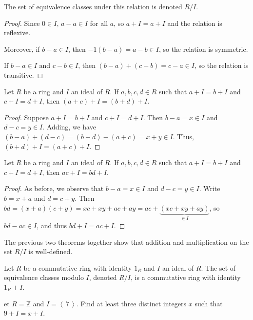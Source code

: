 \documentclass[english,course]{lecture}
\newcommand{\ideal}[1]{\left\langle\, #1 \,\right\rangle}
\theoremstyle{plain}
\newenvironment{exercise}[1]
  {\renewcommand\theinnerexercise{#1}\innerexercise}
  {\endinnerexercise}
\def\Z{{\mathbb Z}}
\def\presnotes{}
\begin{document}
The set of equivalence classes under this relation is denoted $R/I$.

\begin{proof}
	Since $0\in I$, $a-a \in I$ for all $a$, so $a + I = a+I$ and the relation is reflexive.
	
	Moreover, if $b-a \in I$, then $-1(b-a) = a-b \in I$, so the relation is symmetric.
	
	If $b-a \in I$ and $c-b\in I$, then $(b-a) + (c-b) = c-a \in I$, so the relation is transitive.
\end{proof}



\begin{theorem}
	Let $R$ be a ring and $I$ an ideal of $R$.
	If $a,b,c,d\in R$ such that $a+I = b+I$ and $c+I = d+I$, then $(a+c) + I = (b+d) + I$.
\end{theorem}

\begin{proof}
	Suppose $a+I = b+I$ and $c+I = d+I$.
	Then $b-a =x \in I$ and $d-c = y \in I$.
	Adding, we have $(b-a) + (d-c) = (b+d) - (a+c)  = x+y \in I$.
	Thus, $(b+d) + I = (a+c) + I$.
\end{proof}


\begin{theorem}
	Let $R$ be a ring and $I$ an ideal of $R$.
	If $a,b,c,d\in R$ such that $a+I = b+I$ and $c+I = d+I$, then $ac + I = bd + I$.
\end{theorem}

\begin{proof}
	As before, we observe that $b-a = x\in I$ and $d-c = y\in I$.
	Write $b = x+a$ and $d = c+y$.
	Then $bd = (x+a)(c+y) = xc + xy + ac + ay = ac + \underbrace{(xc+xy+ay)}_{\in I}$, so $bd - ac \in I$, and thus $bd + I = ac + I$.
\end{proof}



The previous two theorems together show that addition and multiplication on the set $R/I$ is well-defined.


\begin{unnumberedtheorem}
	Let $R$ be a commutative ring with identity $1_R$ and $I$ an ideal of $R$.
	The set of equivalence classes modulo $I$, denoted $R/I$, is a commutative ring with identity $1_R + I$.
\end{unnumberedtheorem}

\begin{exercise}
	Let $R = \Z$ and $I = \ideal{7}$.
	Find at least three distinct integers $x$ such that $9 + I = x + I$.
\end{exercise}
\end{document}
